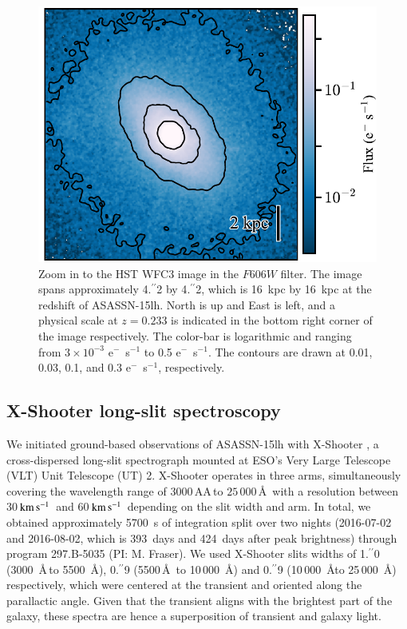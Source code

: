 \documentclass[traditabstract]{aa}
\newcommand{\farc}{\hbox{$.\!\!^{\prime\prime}$}}
\newcommand{\kms}{$\rm{km\,s^{-1}}$}
\begin{document}
\begin{figure}
  \includegraphics[width=0.999\linewidth]{fig/WFC3_ASASSN-15lh_wfc2.pdf}
\caption{Zoom in to the HST WFC3 image in the $F606W$ filter. The image spans approximately 4\farc{2} by 4\farc{2}, which is 16~kpc by 16~kpc at the redshift of ASASSN-15lh. North is up and East is left, and a physical scale at $z=0.233$ is indicated in the bottom right corner of the image respectively. The color-bar is logarithmic and ranging from $3\times10^{-3}$ e$^{-}$~s$^{-1}$ to 0.5 e$^{-}$~s$^{-1}$. The contours are drawn at 0.01, 0.03, 0.1, and 0.3 e$^{-}$~s$^{-1}$, respectively.}
\label{fig:fczoom}
\end{figure}



\subsection{X-Shooter long-slit spectroscopy}
\label{obs:xs}

We initiated ground-based observations of ASASSN-15lh with X-Shooter \citep{2011A&A...536A.105V}, a cross-dispersed long-slit spectrograph mounted at ESO's Very Large Telescope (VLT) Unit Telescope (UT) 2. X-Shooter operates in three arms, simultaneously covering the wavelength range of $3000$\,AA\,to $25\,000$\,\AA\, with a resolution between 30\,\kms\, and 60\,\kms\, depending on the slit width and arm. In total, we obtained approximately 5700~s of integration split over two nights (2016-07-02 and 2016-08-02, which is 393~days and 424~days after peak brightness) through program 297.B-5035 (PI: M. Fraser). We used X-Shooter slits widths of 1\farc{0} (3000~\AA\,to 5500~\AA), 0\farc{9} (5500\,\AA~to 10\,000~\AA) and  0\farc{9} (10\,000~\AA to 25\,000~\AA) respectively, which were centered at the transient and oriented along the parallactic angle. Given that the transient aligns with the brightest part of the galaxy, these spectra are hence a superposition of transient and galaxy light.
\end{document}
